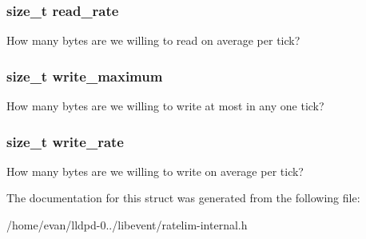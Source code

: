 \subsubsection[{read\-\_\-rate}]{\setlength{\rightskip}{0pt plus 5cm}size\-\_\-t {\bf read\-\_\-rate}}\label{structev__token__bucket__cfg_a3d423556d4feeefabd98dfb7b16b0ef8}
\-How many bytes are we willing to read on average per tick? 
\subsubsection[{write\-\_\-maximum}]{\setlength{\rightskip}{0pt plus 5cm}size\-\_\-t {\bf write\-\_\-maximum}}\label{structev__token__bucket__cfg_ae14c574c73d253d28b3dc7d85b6c64da}
\-How many bytes are we willing to write at most in any one tick? 
\subsubsection[{write\-\_\-rate}]{\setlength{\rightskip}{0pt plus 5cm}size\-\_\-t {\bf write\-\_\-rate}}\label{structev__token__bucket__cfg_ac4d1b1b936e51f00413f4544e22f880b}
\-How many bytes are we willing to write on average per tick? 

\-The documentation for this struct was generated from the following file\-:\begin{DoxyCompactItemize}
\item 
/home/evan/lldpd-\/0../libevent/ratelim-\/internal.\-h\end{DoxyCompactItemize}
